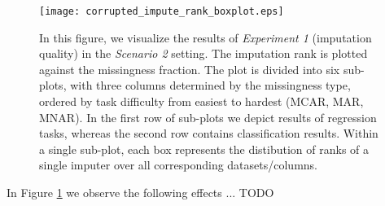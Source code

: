 \begin{figure}\centering
    \texttt{[image: corrupted\_impute\_rank\_boxplot.eps]}

    \caption[Scenario 2 Imputation Ranks]{In this figure, we visualize the results of \textit{Experiment 1} (imputation quality) in the \textit{Scenario 2} setting. The imputation rank is plotted against the missingness fraction. The plot is divided into six sub-plots, with three columns determined by the missingness type, ordered by task difficulty from easiest to hardest (MCAR, MAR, MNAR). In the first row of sub-plots we depict results of regression tasks, whereas the second row contains classification results. Within a single sub-plot, each box represents the distibution of ranks of a single imputer over all corresponding datasets/columns.
    }\label{fig:corrupted_impute_rank_boxplot}
\end{figure}

In Figure \ref{fig:corrupted_impute_rank_boxplot} we observe the following effects ...
TODO
